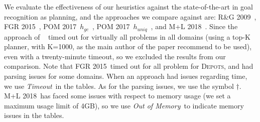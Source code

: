 \documentclass[letterpaper]{article}
\newcommand{\timeout}{{\it Timeout}}
\newcommand{\outofmemory}{{\it Out of Memory}}
\newcommand{\uniqueness}{POM 2017~$h_{\mathit{uniq}}$}
\newcommand{\completion}{POM 2017~$h_{\mathit{gc}}$}
\newcommand{\rg}{R\&G 2009}
\newcommand{\fgr}{FGR 2015}
\newcommand{\mirroring}{M+L 2018}
\begin{document}
We evaluate the effectiveness of our heuristics against the state-of-the-art in goal recognition as planning, and the approaches we compare against are: \rg~\cite{Ramirez:2009wo}, \fgr~\cite{Martin:2015ta}, \completion~\cite{PereiraOrenMeneguzzi2017}, \uniqueness~\cite{PereiraOrenMeneguzzi2017}, and \mirroring~\cite{MorEtAl_AAMAS18}. Since the approach of \citeauthor{Sohrabi:2016uw}~ timed out for virtually all problems in all domains (using a top-K planner, with K=1000, as the main author of the paper recommend to be used), even with a twenty-minute timeout, so we excluded the results from our comparison. Note that \fgr~timed out for all problem for \textsc{Depots}, and had parsing issues for some domains. When an approach had issues regarding time, we use \timeout~in the tables. As for the parsing issues, we use the symbol $\dag$. \mirroring~has faced some issues with respect to memory usage (we set a maximum usage limit of 4GB), so we use \outofmemory~to indicate memory issues in the tables.
\end{document}
